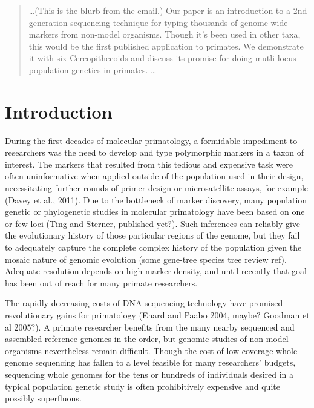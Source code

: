 \documentclass[12pt]{article}
\begin{document}
\maketitle

\begin{abstract}
\ldots (This is the blurb from the email.) Our paper is an introduction to a 2nd generation sequencing technique for typing thousands of genome-wide markers from non-model organisms. Though it's been used in other taxa, this would be the first published application to primates. We demonstrate it with six Cercopithecoids and discuss its promise for doing mutli-locus population genetics in primates. \ldots
\end{abstract}

\section{Introduction}

During the first decades of molecular primatology, a formidable impediment to researchers was the need to develop and type polymorphic markers in a taxon of interest. The markers that resulted from this tedious and expensive task were often uninformative when applied outside of the population used in their design, necessitating further rounds of primer design or microsatellite assays, for example (Davey et al., 2011). Due to the bottleneck of marker discovery, many population genetic or phylogenetic studies in molecular primatology have been based on one or few loci (Ting and Sterner, published yet?). Such inferences can reliably give the evolutionary history of those particular regions of the genome, but they fail to adequately capture the complete complex history of the population given the mosaic nature of genomic evolution (some gene-tree species tree review ref). Adequate resolution depends on high marker density, and until recently that goal has been out of reach for many primate researchers.

The rapidly decreasing costs of DNA sequencing technology have promised revolutionary gains for primatology (Enard and Paabo 2004, maybe? Goodman et al 2005?). A primate researcher benefits from the many nearby sequenced and assembled reference genomes in the order, but genomic studies of non-model organisms nevertheless remain difficult. Though the cost of low coverage whole genome sequencing has fallen to a level feasible for many researchers' budgets, sequencing whole genomes for the tens or hundreds of individuals desired in a typical population genetic study is often prohibitively expensive and quite possibly superfluous. 
\end{document}
